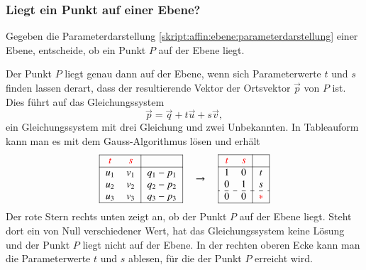 \subsubsection{Liegt ein Punkt auf einer Ebene?}
\begin{aufgabe}
Gegeben die Parameterdarstellung
\eqref{skript:affin:ebene:parameterdarstellung}
einer Ebene, entscheide, ob ein Punkt $P$ auf der Ebene liegt.
\end{aufgabe}
Der Punkt $P$ liegt genau dann auf der Ebene, wenn sich Parameterwerte
$t$ und $s$ finden lassen derart, dass der resultierende Vektor
der Ortsvektor $\vec{p}$ von $P$ ist.
Dies führt auf das Gleichungssystem
\[
\vec{p}
=
\vec{q} + t\vec{u} + s\vec{v},
\]
ein Gleichungssystem mit drei Gleichung und zwei Unbekannten.
In Tableauform kann man es mit dem Gauss-Algorithmus lösen und
erhält
\[
\begin{tabular}{|>{$}c<{$}>{$}c<{$}|>{$}c<{$}|}
\hline
\color{red}t&\color{red}s&\\
\hline
u_1&v_1&q_1-p_1\\
u_2&v_2&q_2-p_2\\
u_3&v_3&q_3-p_3\\
\hline
\end{tabular}
\quad\rightarrow\quad
\begin{tabular}{|>{$}c<{$}>{$}c<{$}|>{$}c<{$}|}
\hline
\color{red}t&\color{red}s&\\
\hline
1&0&t\\
0&1&s\\
\hdashline
0&0&\color{red}*\\
\hline
\end{tabular}
\]
Der rote Stern rechts unten zeigt an, ob der Punkt $P$ auf der Ebene liegt.
Steht dort ein von Null verschiedener Wert, hat das Gleichungssystem keine
Lösung und der Punkt $P$ liegt nicht auf der Ebene.
In der rechten oberen Ecke kann man die Parameterwerte $t$ und $s$
ablesen, für die der Punkt $P$ erreicht wird.

